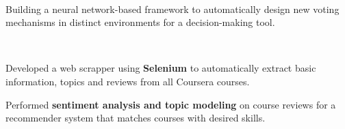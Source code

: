 \documentclass[]{dafirebanks-resume-openfont}
\begin{document}
\begin{minipage}[t]{0.66\textwidth}

\\
\hspace{85pt} 
\begin{tightemize}
	\item Building a neural network-based framework to automatically design new voting mechanisms in distinct environments for a decision-making tool.
\end{tightemize}
\sectionsep







\\
\hspace{130pt} 
\begin{tightemize}
	\item Developed a web scrapper using \textbf{Selenium} to automatically extract basic information, topics and reviews from all Coursera courses.
	\item Performed \textbf{sentiment analysis and topic modeling} on course reviews for a recommender system that matches courses with desired skills. 
\end{tightemize}
\sectionsep


\end{minipage}
\end{document}
